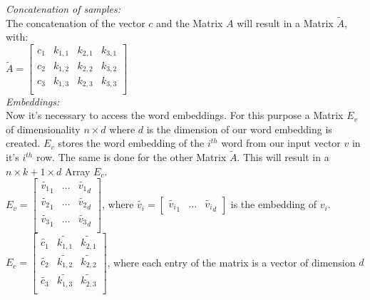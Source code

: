 \textit{Concatenation of samples:}\\
The concatenation of the vector $c$ and the Matrix $A$ will result in a Matrix $\tilde{A}$, with:\\
$\tilde{A} = \begin{bmatrix}
c_1 & k_{1,1} & k_{2,1} & k_{3,1}\\
c_2 & k_{1,2} & k_{2,2} & k_{3,2}\\
c_3 & k_{1,3} & k_{2,3}& k_{3,3}\\
\end{bmatrix}$\\

\textit{Embeddings:}\\
Now it's necessary to access the word embeddings. For this purpose a Matrix $E_v$ of dimensionality $n \times d$ where $d$ is the dimension of our word embedding is created. $E_v$ stores the word embedding of the $i^{th}$ word from our input vector $v$ in it's $i^{th}$ row. The same is done for the other Matrix $\tilde{A}$. This will result in a $n \times k+1 \times d$ Array $E_c$. \\
$E_v = \begin{bmatrix}
\tilde{v_1}_1 & \ldots & \tilde{v_1}_d\\
\tilde{v_2}_1 & \ldots & \tilde{v_2}_d\\
\tilde{v_3}_1 & \ldots & \tilde{v_3}_d\\
\end{bmatrix}
$, where $\tilde{v_i} = \begin{bmatrix}
\tilde{v_i}_1 & \ldots & \tilde{v_i}_d \end{bmatrix}$ is the embedding of $v_i$. \\

$E_c = \begin{bmatrix}
\tilde{c_1 }& \tilde{k_{1,1}} & \tilde{k_{2,1}} \\
\tilde{c_2 }& \tilde{k_{1,2}}& \tilde{k_{2,2}} \\
\tilde{c_3 }&\tilde{ k_{1,3} }& \tilde{k_{2,3}}\\
\end{bmatrix}$,
where each entry of the matrix is a vector of dimension $d$\\


